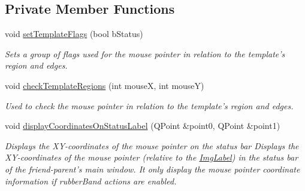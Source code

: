 \subsection*{Private Member Functions}
\begin{CompactItemize}
\item 
void \hyperlink{classImgLabel_1d35f5565e1f0fd6234667b40386b2a4}{setTemplateFlags} (bool bStatus)
\begin{CompactList}\small\item\em Sets a group of flags used for the mouse pointer in relation to the template's region and edges. \item\end{CompactList}\item 
void \hyperlink{classImgLabel_a71c0202c48be349b4fb0813891df43a}{checkTemplateRegions} (int mouseX, int mouseY)
\begin{CompactList}\small\item\em Used to check the mouse pointer in relation to the template's region and edges. \item\end{CompactList}\item 
void \hyperlink{classImgLabel_f8fb1abf00b305d1ba4d8b4745b59692}{displayCoordinatesOnStatusLabel} (QPoint \&point0, QPoint \&point1)
\begin{CompactList}\small\item\em Displays the XY-coordinates of the mouse pointer on the status bar Displays the XY-coordinates of the mouse pointer (relative to the \hyperlink{classImgLabel}{ImgLabel}) in the status bar of the friend-parent's main window. It only display the mouse pointer coordinate information if rubberBand actions are enabled. \item\end{CompactList}\end{CompactItemize}
